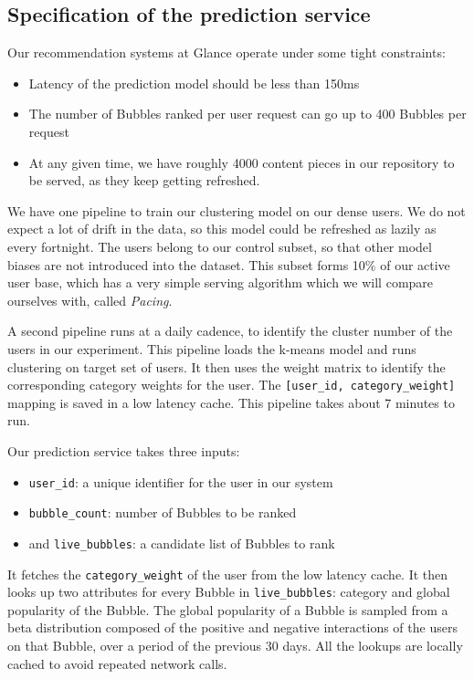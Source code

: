 \subsection{Specification of the prediction service}

Our recommendation systems at Glance operate under some tight constraints: 

\begin{itemize}
    \item Latency of the prediction model should be less than 150ms 
    \item The number of Bubbles ranked per user request can go up to 400 Bubbles per request 
    \item At any given time, we have roughly 4000 content pieces in our repository to be served, as they keep getting refreshed. 
\end{itemize}

We have one pipeline to train our clustering model on our dense users. We do not expect a lot of drift in the data, so this model could be refreshed as lazily as every fortnight. The users belong to our control subset, so that other model biases are not introduced into the dataset. This subset forms 10\% of our active user base, which has a very simple serving algorithm which we will compare ourselves with, called {\itshape Pacing}. 

A second pipeline runs at a daily cadence, to identify the cluster number of the users in our experiment. This pipeline loads the k-means model and runs clustering on target set of users. It then uses the weight matrix to identify the corresponding category weights for the user. The {\verb|[user_id, category_weight]|} mapping is saved in a low latency cache. This pipeline takes about 7 minutes to run. 

Our prediction service takes three inputs:  
\begin{itemize}
    \item {\verb|user_id|}: a unique identifier for the user in our system  
    \item {\verb|bubble_count|}: number of Bubbles to be ranked 
    \item and {\verb|live_bubbles|}: a candidate list of Bubbles to rank 
\end{itemize}

It fetches the {\verb|category_weight|} of the user from the low latency cache. It then looks up two attributes for every Bubble in {\verb|live_bubbles|}: category and global popularity of the Bubble. The global popularity of a Bubble is sampled from a beta distribution composed of the positive and negative interactions of the users on that Bubble, over a period of the previous 30 days. All the lookups are locally cached to avoid repeated network calls. 

